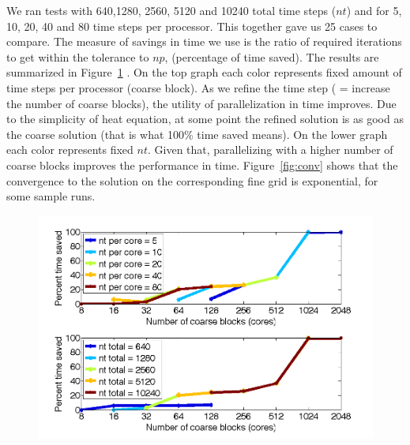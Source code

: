 \documentclass{article}
\begin{document}
We ran tests with 640,1280, 2560, 5120 and 10240 total time steps ($nt$) and for 5, 10, 20, 40 and 80 time steps per processor. This together gave us 25 cases to compare. The measure of savings in time we use is the ratio of required iterations to get within the tolerance to $np$, (percentage of time saved). The results are summarized in Figure~\ref{fig:scal} . On the top graph each color represents fixed amount of time steps per processor (coarse block). As we refine the time step ( = increase the number of coarse blocks), the utility of parallelization in time improves. Due to the simplicity of heat equation, at some point the refined solution is as good as the coarse solution (that is what 100\% time saved means). On the lower graph each color represents fixed $nt$. Given that, parallelizing with a higher number of coarse blocks improves the performance in time.
Figure~\ref{fig:conv} shows that the convergence to the solution on the corresponding fine grid is exponential, for some sample runs.


\begin{figure}
      \begin{center}
	      \includegraphics[width=16cm]{scalability_test}
      \end{center}
\caption{}
\label{fig:scal}
\end{figure}  
\end{document}
